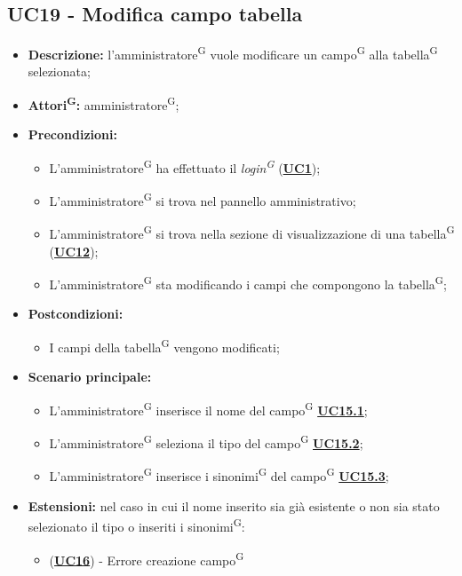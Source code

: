 \subsection{UC19 - Modifica campo tabella}
\label{sec:UC19}
\begin{itemize}
	\item \textbf{Descrizione:} l’amministratore\textsuperscript{G} vuole modificare un campo\textsuperscript{G} alla tabella\textsuperscript{G} selezionata;
	\item \textbf{Attori\textsuperscript{G}:} amministratore\textsuperscript{G};
	\item \textbf{Precondizioni:} 
	\begin{itemize}
		\item L’amministratore\textsuperscript{G} ha effettuato il \textit{login\textsuperscript{G}} (\hyperref[sec:UC1]{\textbf{UC1}});
		\item L’amministratore\textsuperscript{G} si trova nel pannello amministrativo;
		\item L’amministratore\textsuperscript{G} si trova nella sezione di visualizzazione di una tabella\textsuperscript{G} (\hyperref[sec:UC12]{\textbf{UC12}});
		\item L’amministratore\textsuperscript{G} sta modificando i campi che compongono la tabella\textsuperscript{G};
	\end{itemize}
	\item \textbf{Postcondizioni:} 
	\begin{itemize}
		\item I campi della tabella\textsuperscript{G} vengono modificati;
	\end{itemize}
	\item \textbf{Scenario principale:} 
	\begin{itemize}
		\item L’amministratore\textsuperscript{G} inserisce il nome del campo\textsuperscript{G} \hyperref[sec:UC15.1]{\textbf{UC15.1}};
		\item L'amministratore\textsuperscript{G} seleziona il tipo del campo\textsuperscript{G} \hyperref[sec:UC15.2]{\textbf{UC15.2}};
		\item L'amministratore\textsuperscript{G} inserisce i sinonimi\textsuperscript{G} del campo\textsuperscript{G} \hyperref[sec:UC15.3]{\textbf{UC15.3}};
	\end{itemize}

		\item \textbf{Estensioni:} nel caso in cui il nome inserito sia già esistente o non sia stato selezionato il tipo o inseriti i sinonimi\textsuperscript{G}:
		\begin{itemize}
			\item (\hyperref[sec:UC16]{\textbf{UC16}}) - Errore creazione campo\textsuperscript{G}
	\end{itemize}
\end{itemize}


